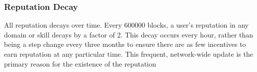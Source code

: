 \subsubsection{Reputation Decay}
All reputation decays over time. Every 600000 blocks, a user's reputation in any domain or skill decays by a factor of 2. This decay occurs every hour, rather than being a step change every three months to ensure there are as few incentives to earn reputation at any particular time. This frequent, network-wide update is the primary reason for the existence of the reputation




